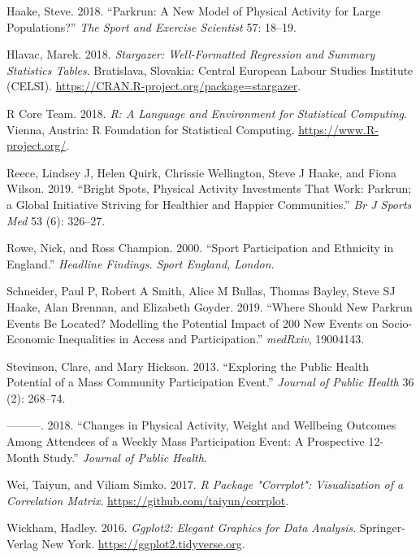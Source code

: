 \documentclass[]{article}
\begin{document}
\leavevmode\hypertarget{ref-haake2018parkrun}{}%
Haake, Steve. 2018. ``Parkrun: A New Model of Physical Activity for
Large Populations?'' \emph{The Sport and Exercise Scientist} 57: 18--19.

\leavevmode\hypertarget{ref-stargazer}{}%
Hlavac, Marek. 2018. \emph{Stargazer: Well-Formatted Regression and
Summary Statistics Tables}. Bratislava, Slovakia: Central European
Labour Studies Institute (CELSI).
\url{https://CRAN.R-project.org/package=stargazer}.

\leavevmode\hypertarget{ref-base_r}{}%
R Core Team. 2018. \emph{R: A Language and Environment for Statistical
Computing}. Vienna, Austria: R Foundation for Statistical Computing.
\url{https://www.R-project.org/}.

\leavevmode\hypertarget{ref-reece2019bright}{}%
Reece, Lindsey J, Helen Quirk, Chrissie Wellington, Steve J Haake, and
Fiona Wilson. 2019. ``Bright Spots, Physical Activity Investments That
Work: Parkrun; a Global Initiative Striving for Healthier and Happier
Communities.'' \emph{Br J Sports Med} 53 (6): 326--27.

\leavevmode\hypertarget{ref-rowe2000sport}{}%
Rowe, Nick, and Ross Champion. 2000. ``Sport Participation and Ethnicity
in England.'' \emph{Headline Findings. Sport England, London}.

\leavevmode\hypertarget{ref-schneider2019}{}%
Schneider, Paul P, Robert A Smith, Alice M Bullas, Thomas Bayley, Steve
SJ Haake, Alan Brennan, and Elizabeth Goyder. 2019. ``Where Should New
Parkrun Events Be Located? Modelling the Potential Impact of 200 New
Events on Socio-Economic Inequalities in Access and Participation.''
\emph{medRxiv}, 19004143.

\leavevmode\hypertarget{ref-stevinson2013exploring}{}%
Stevinson, Clare, and Mary Hickson. 2013. ``Exploring the Public Health
Potential of a Mass Community Participation Event.'' \emph{Journal of
Public Health} 36 (2): 268--74.

\leavevmode\hypertarget{ref-stevinson2018changes}{}%
---------. 2018. ``Changes in Physical Activity, Weight and Wellbeing
Outcomes Among Attendees of a Weekly Mass Participation Event: A
Prospective 12-Month Study.'' \emph{Journal of Public Health}.

\leavevmode\hypertarget{ref-corrplot2017}{}%
Wei, Taiyun, and Viliam Simko. 2017. \emph{R Package "Corrplot":
Visualization of a Correlation Matrix}.
\url{https://github.com/taiyun/corrplot}.

\leavevmode\hypertarget{ref-ggplot2}{}%
Wickham, Hadley. 2016. \emph{Ggplot2: Elegant Graphics for Data
Analysis}. Springer-Verlag New York.
\url{https://ggplot2.tidyverse.org}.
\end{document}
